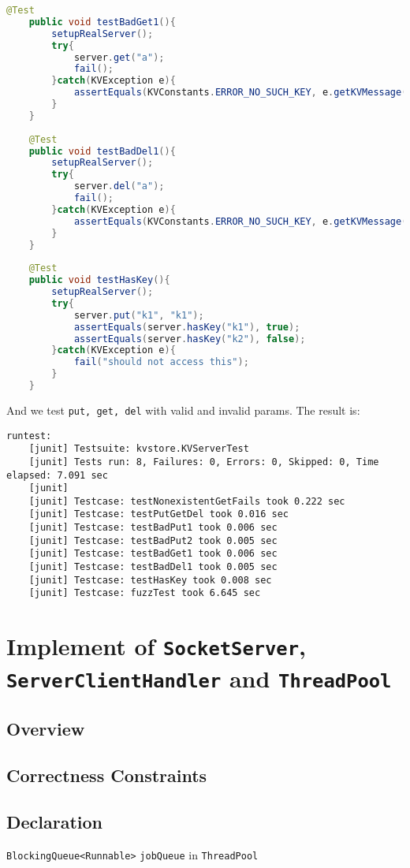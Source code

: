\documentclass{article}
\begin{document}
\begin{lstlisting}[language=java]
    @Test
    public void testBadGet1(){
    	setupRealServer();
    	try{
    		server.get("a");
    		fail();
    	}catch(KVException e){
    		assertEquals(KVConstants.ERROR_NO_SUCH_KEY, e.getKVMessage().getMessage());
    	}
    }
    
    @Test
    public void testBadDel1(){
    	setupRealServer();
    	try{
    		server.del("a");
    		fail();
    	}catch(KVException e){
    		assertEquals(KVConstants.ERROR_NO_SUCH_KEY, e.getKVMessage().getMessage());
    	}
    }
    
    @Test
    public void testHasKey(){
    	setupRealServer();
    	try{
    		server.put("k1", "k1");
    		assertEquals(server.hasKey("k1"), true);
    		assertEquals(server.hasKey("k2"), false);
    	}catch(KVException e){
    		fail("should not access this");
    	}
    }
\end{lstlisting}

And we test \texttt{put, get, del} with valid and invalid params. The result is:
\begin{lstlisting}
runtest:
    [junit] Testsuite: kvstore.KVServerTest
    [junit] Tests run: 8, Failures: 0, Errors: 0, Skipped: 0, Time elapsed: 7.091 sec
    [junit] 
    [junit] Testcase: testNonexistentGetFails took 0.222 sec
    [junit] Testcase: testPutGetDel took 0.016 sec
    [junit] Testcase: testBadPut1 took 0.006 sec
    [junit] Testcase: testBadPut2 took 0.005 sec
    [junit] Testcase: testBadGet1 took 0.006 sec
    [junit] Testcase: testBadDel1 took 0.005 sec
    [junit] Testcase: testHasKey took 0.008 sec
    [junit] Testcase: fuzzTest took 6.645 sec
\end{lstlisting}

\section{Implement of \texttt{SocketServer}, \texttt{ServerClientHandler} and \texttt{ThreadPool}}
\subsection{Overview}
\subsection{Correctness Constraints}
\subsection{Declaration}
\begin{compactitem}
	\item \texttt{BlockingQueue<Runnable>} \texttt{jobQueue} in \texttt{ThreadPool}
\end{compactitem}
\end{document}
